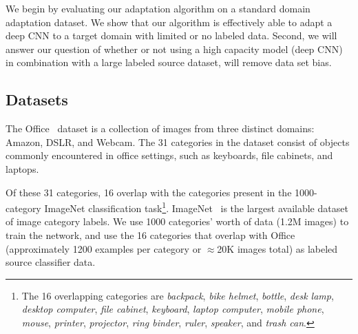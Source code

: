 \label{sec:eval}

We begin by evaluating our adaptation algorithm on a standard domain adaptation dataset.
We show that our algorithm is effectively able to adapt a deep CNN to a target domain with limited or no
labeled data.
Second, we will answer our question of whether or not using a high capacity 
model (deep CNN) in combination with a large labeled source dataset, will remove data set 
bias. 



\subsection{Datasets}
The Office~\cite{saenko-eccv10} dataset is a collection of images from three
distinct domains: Amazon, DSLR, and Webcam. The 31 categories in the dataset
consist of objects commonly encountered in office settings, such as keyboards,
file cabinets, and laptops. 

Of these 31 categories, 16 overlap with the
categories present in the 1000-category ImageNet classification task\footnote{
The 16 overlapping categories are
\textit{backpack},
 \textit{bike helmet},
 \textit{bottle},
 \textit{desk lamp},
 \textit{desktop computer},
 \textit{file cabinet},
 \textit{keyboard},
 \textit{laptop computer},
 \textit{mobile phone},
 \textit{mouse},
 \textit{printer},
 \textit{projector},
 \textit{ring binder},
 \textit{ruler},
 \textit{speaker},
 and
 \textit{trash can}.
}.
ImageNet~\cite{ilsvrc2012} is the largest available dataset of image category labels. We use 1000 categories' worth of data (1.2M images) to train the network, and use the 16 categories that overlap with Office (approximately 1200 examples per category or  $\approx$20K images total) as labeled source classifier data.


